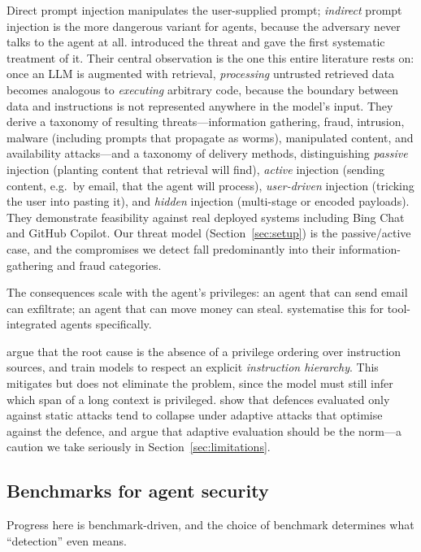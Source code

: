 \documentclass[preprint,12pt,authoryear]{elsarticle}
\theoremstyle{definition}
\begin{document}
Direct prompt injection manipulates the user-supplied prompt; \emph{indirect}
prompt injection is the more dangerous variant for agents, because the adversary
never talks to the agent at all. \citet{greshake2023notwhat} introduced the
threat and gave the first systematic treatment of it. Their central observation
is the one this entire literature rests on: once an LLM is augmented with
retrieval, \emph{processing} untrusted retrieved data becomes analogous to
\emph{executing} arbitrary code, because the boundary between data and
instructions is not represented anywhere in the model's input. They derive a
taxonomy of resulting threats---information gathering, fraud, intrusion, malware
(including prompts that propagate as worms), manipulated content, and
availability attacks---and a taxonomy of delivery methods, distinguishing
\emph{passive} injection (planting content that retrieval will find),
\emph{active} injection (sending content, e.g.\ by email, that the agent will
process), \emph{user-driven} injection (tricking the user into pasting it), and
\emph{hidden} injection (multi-stage or encoded payloads). They demonstrate
feasibility against real deployed systems including Bing Chat and GitHub Copilot.
Our threat model (Section~\ref{sec:setup}) is the passive/active case, and the
compromises we detect fall predominantly into their information-gathering and
fraud categories.

The consequences scale with the agent's privileges: an agent that can send email
can exfiltrate; an agent that can move money can steal.
\citet{zhan2024injecagent} systematise this for tool-integrated agents
specifically.

\citet{wallace2024instructionhierarchy} argue that the root cause is the absence
of a privilege ordering over instruction sources, and train models to respect an
explicit \emph{instruction hierarchy}. This mitigates but does not eliminate the
problem, since the model must still infer which span of a long context is
privileged. \citet{nasr2025attackersecond} show that defences evaluated only
against static attacks tend to collapse under adaptive attacks that optimise
against the defence, and argue that adaptive evaluation should be the norm---a
caution we take seriously in Section~\ref{sec:limitations}.

\subsection{Benchmarks for agent security}

Progress here is benchmark-driven, and the choice of benchmark determines what
``detection'' even means.
\end{document}
